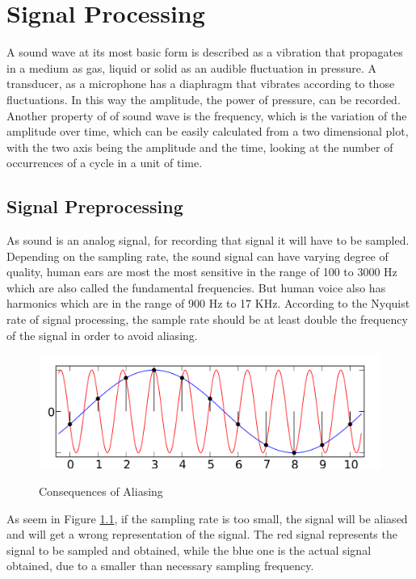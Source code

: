 \chapter{Signal Processing}\label{ch:signalProcessing}
A sound wave at its most basic form is described as a vibration that propagates in a medium as gas, 
liquid or solid as an audible fluctuation in pressure. A transducer, as a microphone has a diaphragm 
that vibrates according to those fluctuations. In this way the amplitude, the power of pressure, 
can be recorded. Another property of of sound wave is the frequency, which is the variation of 
the amplitude over time, which can be easily calculated from a two dimensional plot, with the 
two axis being the amplitude and the time, looking at the number of occurrences of a cycle in a unit of time.\cite{SOUNDWAVE}

\section{Signal Preprocessing}
As sound is an analog signal, for recording that signal it will have to be sampled. Depending on the 
sampling rate, the sound signal can have varying degree of quality, human ears are most the most 
sensitive in the range of 100 to 3000 Hz which are also called the fundamental frequencies. But 
human voice also has harmonics which are in the range of 900 Hz to 17 KHz.
According to the Nyquist rate of signal processing, the sample rate should be at 
least double the frequency of the signal in order to avoid aliasing.\cite{VOICEFREQUENCY}
\newpage
\begin{figure}[htp]
	\centering
	\includegraphics[width=1\textwidth]{Illustrations/AliasingSines.png}
	\caption{Consequences of Aliasing}\cite{ALIASING}
	\label{fig:AliasingSines}
\end{figure}

As seem in Figure \ref{fig:AliasingSines}, if the sampling rate is too small, the signal will 
be aliased and will get a wrong representation of the signal. The red signal represents
the signal to be sampled and obtained, while the blue one is the actual signal obtained, due to a 
smaller than necessary sampling frequency.

